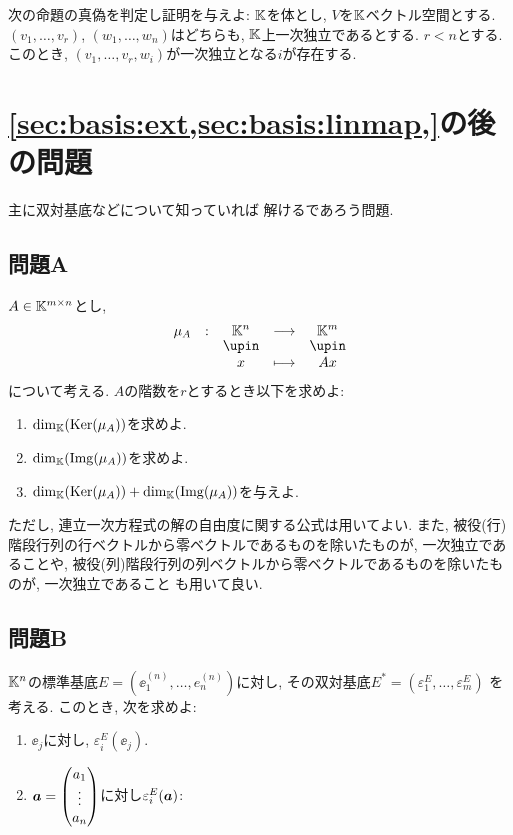 \begin{quiz}
  次の命題の真偽を判定し証明を与えよ:
$\mathbb{K}$を体とし,
  $V$を$\mathbb{K}$ベクトル空間とする.
  $(v_1,\ldots, v_r)$,
  $(w_1,\ldots, w_n)$はどちらも,
  $\mathbb{K}$上一次独立であるとする.
$r<n$とする.
  このとき,
$(v_1,\ldots,v_{r},w_{i})$が一次独立となる$i$が存在する.
\end{quiz}



%
\section{\cref{sec:basis:ext,sec:basis:linmap,}の後の問題}
主に双対基底などについて知っていれば
解けるであろう問題.
\subsection{問題A}
\begin{quiz}
  $A\in\mathbb{K}^{m\times n}$とし,
  \begin{align*}
    \shazo{\mu_A}{\KK^n}{\KK^m}
    {x}{Ax}
  \end{align*}
  について考える.
  $A$の階数を$r$とするとき以下を求めよ:
  \begin{enumerate}
  \item $\dim_{\mathbb{K}}(\operatorname{Ker}(\mu_A))$を求めよ.
  \item $\dim_{\mathbb{K}}(\operatorname{Img}(\mu_A))$を求めよ.
  \item $\dim_{\mathbb{K}}(\operatorname{Ker}(\mu_A))+\dim_{\mathbb{K}}(\operatorname{Img}(\mu_A))$を与えよ.
  \end{enumerate}
  ただし,
  連立一次方程式の解の自由度に関する公式は用いてよい.
  また,
  被役(行)階段行列の行ベクトルから零ベクトルであるものを除いたものが,
  一次独立であることや,
  被役(列)階段行列の列ベクトルから零ベクトルであるものを除いたものが,
  一次独立であること
  も用いて良い.
\end{quiz}



\subsection{問題B}
\begin{quiz}
  $\mathbb{K}^n$の標準基底$E=(\ee^{(n)}_1,\ldots,e^{(n)}_n)$に対し,
  その双対基底$E^\ast=(\varepsilon_1^{E},\ldots,\varepsilon_m^{E})$
  を考える.
  このとき, 次を求めよ:
  \begin{enumerate}
    \item $\ee_j$に対し, $\varepsilon_i^{E}(\ee_j)$.
    \item $\boldsymbol{a}=\begin{pmatrix}a_1\\\vdots\\a_n\end{pmatrix}$に対し$\varepsilon_i^{E}(\boldsymbol{a})$:
  \end{enumerate}
\end{quiz}

